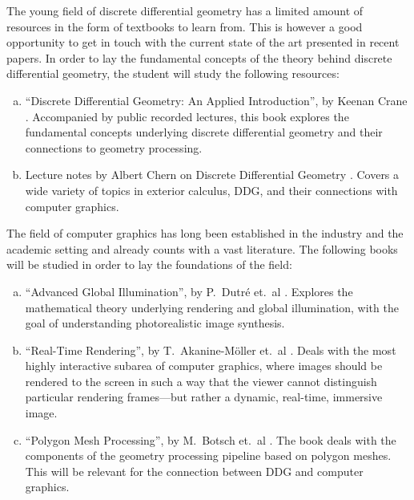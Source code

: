 \documentclass[11pt,reqno]{amsart}
\theoremstyle{definition}
\begin{document}
The young field of discrete differential geometry has a limited amount of resources in the form of
textbooks to learn from. This is however a good opportunity to get in touch with the current state
of the art presented in recent papers. In order to lay the fundamental concepts of the theory behind
discrete differential geometry, the student will study the following resources: 
\begin{enumerate}[(a)]\setlength\itemsep{0em}
    \item ``Discrete Differential Geometry: An Applied Introduction'', by Keenan Crane
        \cite{DDG-AAI-2023-Crane}. Accompanied by public recorded lectures, this book explores the
        fundamental concepts underlying discrete differential geometry and their connections to
        geometry processing.
    \item Lecture notes by Albert Chern on Discrete Differential Geometry \cite{DDG-2020-Chern,Wang-2023-ECIG}.
        Covers a wide variety of topics in exterior calculus, DDG, and
        their connections with computer graphics.
\end{enumerate}

The field of computer graphics has long been established in the industry and the academic setting
and already counts with a vast literature. The following books will be studied in order to lay the
foundations of the field:
\begin{enumerate}[(a)]\setlength\itemsep{0em}
    \item ``Advanced Global Illumination'', by P.~Dutr\'{e} et.~al \cite{AGI-2006}. Explores the
        mathematical theory underlying rendering and global illumination, with the goal of
        understanding photorealistic image synthesis.
    \item ``Real-Time Rendering'', by T.~Akanine-M\"{o}ller et.~al \cite{RTR-2018-Moller}. Deals with
        the most highly interactive subarea of computer graphics, where images should be rendered to
        the screen in such a way that the viewer cannot distinguish particular rendering
        frames---but rather a dynamic, real-time, immersive image.
    \item ``Polygon Mesh Processing'', by M.~Botsch et.~al \cite{PMP-2010}. The book deals with the
        components of the geometry processing pipeline based on polygon meshes. This will be
        relevant for the connection between DDG and computer graphics.
\end{enumerate}


\appendix
\end{document}

